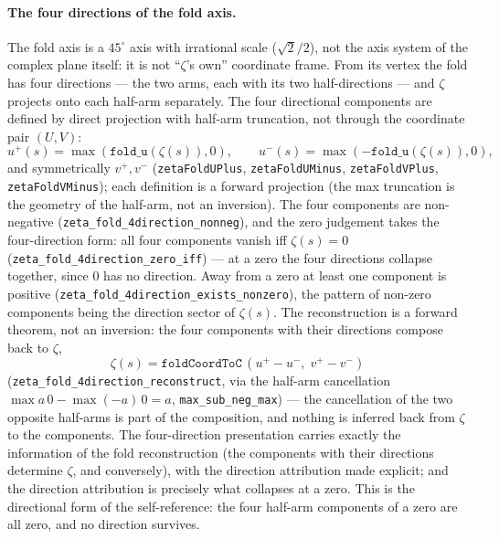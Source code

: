 \documentclass{article}
\newcommand{\zt}{\zeta}
\begin{document}
\paragraph{The four directions of the fold axis.}
The fold axis is a $45^\circ$ axis with irrational scale
($\sqrt2/2$), not the axis system of the complex plane itself: it is
not ``$\zt$'s own'' coordinate frame. From its vertex the fold has
four directions --- the two arms, each with its two half-directions ---
and $\zt$ projects onto each half-arm separately. The four directional
components are defined by direct projection with half-arm truncation,
not through the coordinate pair $(U,V)$:
\begin{equation}
  u^+(s)=\max(\texttt{fold\_u}(\zt(s)),0),\qquad
  u^-(s)=\max(-\texttt{fold\_u}(\zt(s)),0),
\end{equation}
and symmetrically $v^+,v^-$ (\texttt{zetaFoldUPlus},
\texttt{zetaFoldUMinus}, \texttt{zetaFoldVPlus},
\texttt{zetaFoldVMinus}); each definition is a forward projection
(the max truncation is the geometry of the half-arm, not an inversion).
The four components are non-negative
(\texttt{zeta\_fold\_4direction\_nonneg}), and the zero judgement takes
the four-direction form: all four components vanish iff $\zt(s)=0$
(\texttt{zeta\_fold\_4direction\_zero\_iff}) --- at a zero the four
directions collapse together, since $0$ has no direction. Away from a
zero at least one component is positive
(\texttt{zeta\_fold\_4direction\_exists\_nonzero}), the pattern of
non-zero components being the direction sector of $\zt(s)$. The
reconstruction is a forward theorem, not an inversion: the four
components with their directions compose back to $\zt$,
\begin{equation}
  \zt(s)=\texttt{foldCoordToC}\,(u^+-u^-,\;v^+-v^-)
\end{equation}
(\texttt{zeta\_fold\_4direction\_reconstruct}, via the half-arm
cancellation $\max a\,0-\max(-a)\,0=a$,
\texttt{max\_sub\_neg\_max}) --- the cancellation of the two opposite
half-arms is part of the composition, and nothing is inferred back
from $\zt$ to the components. The four-direction presentation carries
exactly the information of the fold reconstruction (the components
with their directions determine $\zt$, and conversely), with the
direction attribution made explicit; and the direction attribution is
precisely what collapses at a zero. This is the directional form of
the self-reference: the four half-arm components of a zero are all
zero, and no direction survives.
\end{document}

